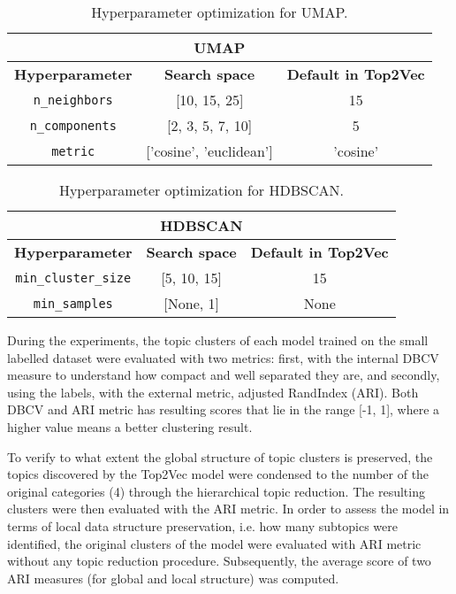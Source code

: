 \documentclass[fontsize=12pt,a4paper,twoside,openany]{scrbook}
\begin{document}
\begin{table}[ht]
    \centering
    \begin{tabular}{ |c|c|c| } 
        \hline
        \multicolumn{3}{|c|}{\textbf{UMAP}} \\
        \hline\hline
        \textbf{Hyperparameter} & \textbf{Search space} &  \textbf{Default in Top2Vec} \\
        \hline
        \verb|n_neighbors| & [10, 15, 25] & 15 \\
        \hline
        \verb|n_components| & [2, 3, 5, 7, 10] & 5 \\
        \hline
        \verb|metric| & ['cosine', 'euclidean'] &  'cosine' \\
        \hline
    \end{tabular}
    \caption{Hyperparameter optimization for UMAP.}
    \label{tab:UMAP_param}
\end{table}


\begin{table}[ht]
    \centering
    \begin{tabular}{ |c|c|c| } 
        \hline
        \multicolumn{3}{|c|}{\textbf{HDBSCAN}} \\
        \hline\hline
        \textbf{Hyperparameter} & \textbf{Search space} &  \textbf{Default in Top2Vec} \\
        \hline
        \verb|min_cluster_size| & [5, 10, 15] & 15 \\
        \hline
        \verb|min_samples| & [None, 1] & None \\
        \hline
    \end{tabular}
    \caption{Hyperparameter optimization for HDBSCAN.}
    \label{tab:HDBSCAN_param}
\end{table}

During the experiments, the topic clusters of each model trained on the small labelled dataset were evaluated with two metrics: first, with the internal DBCV measure to understand how compact and well separated they are, and secondly, using the labels, with the external metric, adjusted RandIndex (ARI). Both DBCV and ARI metric has resulting scores that lie in the range [-1, 1], where a higher value means a better clustering result.

To verify to what extent the global structure of topic clusters is preserved, the topics discovered by the Top2Vec model were condensed to the number of the original categories (4) through the hierarchical topic reduction. The resulting clusters were then evaluated with the ARI metric. In order to assess the model in terms of local data structure preservation, i.e. how many subtopics were identified, the original clusters of the model were evaluated with ARI metric without any topic reduction procedure. Subsequently, the average score of two ARI measures (for global and local structure) was computed. 
\end{document}
